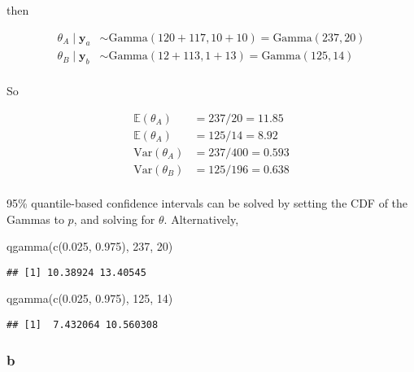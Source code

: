 \documentclass[
]{article}
\newenvironment{Shaded}{\begin{snugshade}}{\end{snugshade}}
\newcommand{\DecValTok}[1]{\textcolor[rgb]{0.00,0.00,0.81}{#1}}
\newcommand{\FloatTok}[1]{\textcolor[rgb]{0.00,0.00,0.81}{#1}}
\newcommand{\FunctionTok}[1]{\textcolor[rgb]{0.00,0.00,0.00}{#1}}
\newcommand{\NormalTok}[1]{#1}
\begin{document}
then

\begin{align}
\theta_A \mid \mathbf{y}_a &\sim \text{Gamma}(120 + 117, 10 + 10) = \text{Gamma}(237, 20) \\
\theta_B \mid \mathbf{y}_b &\sim \text{Gamma}(12 + 113, 1 + 13) = \text{Gamma}(125, 14) \\
\end{align}

So

\begin{align}
\mathbb{E}(\theta_A) &=  237/20 = 11.85\\
\mathbb{E}(\theta_A) &= 125/14 = 8.92\\
\text{Var}(\theta_A) &= 237/400 = 0.593\\
\text{Var}(\theta_B) &= 125/196 = 0.638\\
\end{align}

95\% quantile-based confidence intervals can be solved by setting the
CDF of the Gammas to \(p\), and solving for \(\theta\). Alternatively,

\begin{Shaded}
\begin{Highlighting}[]
\FunctionTok{qgamma}\NormalTok{(}\FunctionTok{c}\NormalTok{(}\FloatTok{0.025}\NormalTok{, }\FloatTok{0.975}\NormalTok{), }\DecValTok{237}\NormalTok{, }\DecValTok{20}\NormalTok{)}
\end{Highlighting}
\end{Shaded}

\begin{verbatim}
## [1] 10.38924 13.40545
\end{verbatim}

\begin{Shaded}
\begin{Highlighting}[]
\FunctionTok{qgamma}\NormalTok{(}\FunctionTok{c}\NormalTok{(}\FloatTok{0.025}\NormalTok{, }\FloatTok{0.975}\NormalTok{), }\DecValTok{125}\NormalTok{, }\DecValTok{14}\NormalTok{)}
\end{Highlighting}
\end{Shaded}

\begin{verbatim}
## [1]  7.432064 10.560308
\end{verbatim}

\hypertarget{b-1}{%
\subsubsection{b}\label{b-1}}
\end{document}
